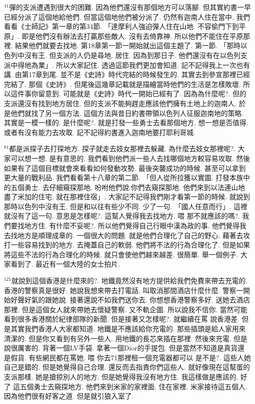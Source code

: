 \documentclass{book}
\begin{document}
$^{41}$彈的支派遭遇到很大的困難.
因為他們還沒有那個地方可以落腳.
但其實約書一早已經分派了這個地給他們.
但當這個地他們被分派了.
仍然有迦南人住在當中.
我們看看《士師記》第一章的第34節.
「達摩利人強迫彈人住在山地.
不容偷門下到平原」.
即是他們沒有辦法去打贏那些敵人.
沒有去倚靠神.
所以他們不能住在平原那裡.
結果他們就要去找地.
第18章第一節一開始就出這個主題了.
第一節.
「那時以色列中沒有王.
但支派的人仍是尋地.
居住.
因為到那日子.
他們還沒有在以色列支派中得地為業」.
所以大家記住.
透過這節我們更加會知道.
記不記得我上一次也有講.
由第17章到尾.
並不是《史詩》時代完結的時候發生的.
其實去到參宣那裡已經完結了.
那個《史詩》.
但尾後這幾章記載就是描繪當時他們的生活是怎樣敗壞.
所以這件事你留意到.
可能就是《史詩》時代一開始已經有了.
因為為什麼呢?.
但的支派還沒有找到地方居住.
但的支派不能夠趕走應該他們擁有土地上的迦南人.
於是他們就找了另一個方法.
這個方法與昔日約書帶領以色列人征服迦南地的策略.
其實是一模一樣的.
是什麼呢?.
就是打發一些勇士去看那個地方.
想一想是否值得.
或者有沒有能力去攻取.
記不記得約書進入迦南地要打耶利哥城.

$^{81}$都是派探子去打探地方.
探子就走去妓女那裡去躲藏.
為什麼去妓女那裡呢?.
大家可以想一想.
是有意思的.
我們看到他們派一些人去找哪個地方較容易攻取.
然後如果有了這個目標就會來看看如何發動攻勢.
最後突襲成功的時候.
甚至可以拿到更大量的戰利品.
我們看看第十八章的第二節.
「但人從所拉獲以實圖.
打發本族中的五個勇士.
去仔細窺探那地.
吩咐他們說:你們去窺探那地.
他們來到以法連山地盡了米加的住宅.
就在那裡住宿」.
大家記不記得我們剛才看第一節的時候.
就說到那時以色列中沒有王.
但是和以往有些少不同.
少了一句.
「國人任意而行」.
這裡就沒有了這一句.
意思是怎樣呢?.
這幫人覺得我去找地方.
喂 那不就應該的嗎?.
我們要找地方住.
有什麼不妥呢?.
所以他們覺得自己行眼中漢為政的事.
他們覺得我去找地方是順理成章的.
一個很大的問題.
就是他們合理化了自己的野心.
藉著去攻打一些容易找到的地方.
去掩蓋自己的軟弱.
他們將不法的行為合理化了.
但是如果將這些不法的行為合理化的時候.
就只會使他們越來越差.
很簡單.
舉一個例子.
大家看到了.
最近有一個大陸的女士拍片.

$^{121}$就說到這個香港是什麼來的?.
地鐵竟然沒有地方提供給我們免費來帶去充電的.
香港的警察真是很好.
她說我想來帶去打電話.
叫取消那間酒店什麼什麼.
警察一開始好聲好氣的跟她說.
接著還說不如我們送你去.
你想想香港警察多好.
送她去酒店那裡.
但是這個女人就來帶她去懷疑警察.
又不軌企圖.
所以說我不信你.
當然可能看到很多香港關於紀律部隊的新聞.
但是接著又怎樣呢?.
就繼續在罵 說香港差.
但是其實我們香港人大家都知道.
地鐵是不應該給你充電的.
那些插頭是給人家用來清潔的.
但是你又看到有另外一些人.
用地鐵的長芯來插在那裡.
然後來充電.
但是說很厲害的.
背著一個LV手袋.
拿著一個Dior的手提包.
但是當然不知道是真貨還是假貨.
有些網民都在罵她.
喂 你去71那裡租一個充電器都可以 是不是?.
這些人她自己是錯的.
但是她覺得自己合理.
還反而去指責你們這些人.
就好像現在這幫蛋的支派那樣.
她是搶掠別人的地方.
但是她覺得我沒有地方住.
我這樣做是應該的.
好了 這五個勇士去窺探地方.
他們來到米家的家裡面.
住在家裡.
米家接待這五個人.
因為他們很有好客之道.
但是就引狼入室了.
\end{document}
